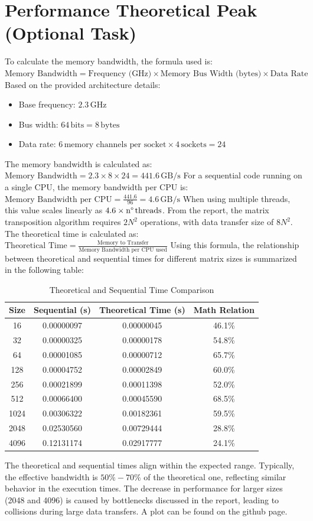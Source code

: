 \section{Performance Theoretical Peak (Optional Task)}
To calculate the memory bandwidth, the formula used is:$ \text{Memory Bandwidth} = \text{Frequency (GHz)} \times \text{Memory Bus Width (bytes)} \times \text{Data Rate}$
Based on the provided architecture details:
\begin{itemize}
    \item Base frequency: $2.3\,\text{GHz}$
    \item Bus width: $64\,\text{bits} = 8\,\text{bytes}$
    \item Data rate: $6\,\text{memory channels per socket} \times 4\,\text{sockets} = 24$
\end{itemize}
The memory bandwidth is calculated as: $\text{Memory Bandwidth} = 2.3 \times 8 \times 24 = 441.6\,\text{GB/s}$
For a sequential code running on a single CPU, the memory bandwidth per CPU is:$\text{Memory Bandwidth per CPU} = \frac{441.6}{96} = 4.6\,\text{GB/s}$
When using multiple threads, this value scales linearly as $4.6 \times \text{n\textdegree\,threads}$. From the report, the matrix transposition algorithm requires $2N^2$ operations, with data transfer size of $8N^2$. The theoretical time is calculated as: $\text{Theoretical Time} = \frac{\text{Memory to Transfer}}{\text{Memory Bandwidth per CPU used}}$
Using this formula, the relationship between theoretical and sequential times for different matrix sizes is summarized in the following table:
\begin{table}[h!]
\centering
\begin{tabular}{|c|c|c|c|}
\hline
\textbf{Size} & \textbf{Sequential (s)} & \textbf{Theoretical Time (s)} & \textbf{Math Relation} \\
\hline
16 & 0.00000097 & 0.00000045 & 46.1\%\\
\hline
32 & 0.00000325 & 0.00000178 & 54.8\%\\
\hline
64 & 0.00001085 & 0.00000712 & 65.7\%\\
\hline
128 & 0.00004752 & 0.00002849 & 60.0\%\\
\hline
256 & 0.00021899 & 0.00011398 & 52.0\%\\
\hline
512 & 0.00066400 & 0.00045590 & 68.5\%\\
\hline
1024 & 0.00306322 & 0.00182361 & 59.5\%\\
\hline
2048 & 0.02530560 & 0.00729444 & 28.8\%\\
\hline
4096 & 0.12131174 & 0.02917777 & 24.1\%\\
\hline
\end{tabular}
\caption{Theoretical and Sequential Time Comparison}
\end{table}
The theoretical and sequential times align within the expected range. Typically, the effective bandwidth is $50\%-70\%$ of the theoretical one, reflecting similar behavior in the execution times. The decrease in performance for larger sizes (2048 and 4096) is caused by bottlenecks discussed in the report, leading to collisions during large data transfers. A plot can be found on the github page.
